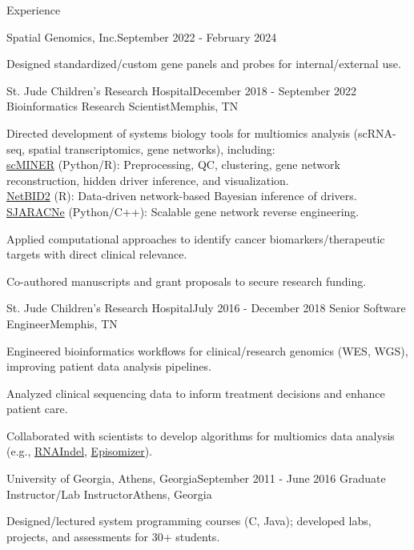 \documentclass{resume} %
\begin{document}
\begin{rSection}{Experience}
\begin{rSubsection}{Spatial Genomics, Inc.}{September 2022 - February 2024}
\item Designed standardized/custom gene panels and probes for internal/external use.
\end{rSubsection}


\begin{rSubsection}{St. Jude Children's Research Hospital}{December 2018 - September 2022}
{Bioinformatics Research Scientist}{Memphis, TN}
\item Directed development of systems biology tools for multiomics analysis (scRNA-seq, spatial transcriptomics, gene networks), including:\\
\href{https://www.nature.com/articles/s41467-025-59620-6}{scMINER} (Python/R): Preprocessing, QC, clustering, gene network reconstruction, hidden driver inference, and visualization.\\
\href{https://www.nature.com/articles/s41467-023-38335-6}{NetBID2} (R): Data-driven network-based Bayesian inference of drivers.\\
\href{https://github.com/jyyulab/SJARACNe}{SJARACNe} (Python/C++): Scalable gene network reverse engineering.

\item Applied computational approaches to identify cancer biomarkers/therapeutic targets with direct clinical relevance.

\item Co-authored manuscripts and grant proposals to secure research funding.
\end{rSubsection}


\begin{rSubsection}{St. Jude Children's Research Hospital}{July 2016 - December 2018}
{Senior Software Engineer}{Memphis, TN}
\item Engineered bioinformatics workflows for clinical/research genomics (WES, WGS), improving patient data analysis pipelines.

\item Analyzed clinical sequencing data to inform treatment decisions and enhance patient care.

\item Collaborated with scientists to develop algorithms for multiomics data analysis (e.g., \href{https://github.com/stjude/RNAIndel}{RNAIndel}, \href{https://github.com/stjude/Episomizer}{Episomizer}).
\end{rSubsection}


\begin{rSubsection}{University of Georgia, Athens, Georgia}{September 2011 - June 2016}
{Graduate Instructor/Lab Instructor}{Athens, Georgia}
\item Designed/lectured system programming courses (C, Java); developed labs, projects, and assessments for 30+ students.
\end{rSubsection}

\end{rSection}
\end{document}
